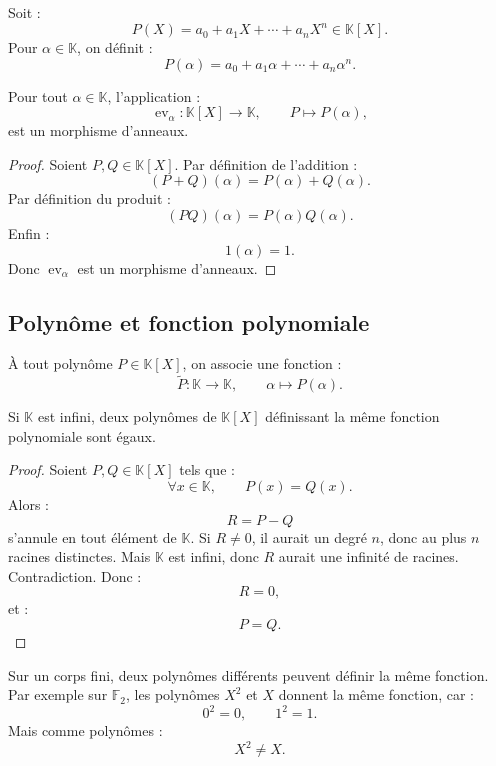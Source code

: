 \documentclass[11pt,a4paper]{article}
\newcommand{\K}{\mathbb K}
\begin{document}
\begin{definitionbox}
Soit :
\[
P(X)=a_0+a_1X+\cdots+a_nX^n\in\K[X].
\]
Pour \(\alpha\in\K\), on définit :
\[
P(\alpha)=a_0+a_1\alpha+\cdots+a_n\alpha^n.
\]
\end{definitionbox}

\begin{theorembox}
Pour tout \(\alpha\in\K\), l'application :
\[
\operatorname{ev}_\alpha:\K[X]\to\K,
\qquad
P\mapsto P(\alpha),
\]
est un morphisme d'anneaux.
\end{theorembox}

\begin{proof}
Soient \(P,Q\in\K[X]\).  
Par définition de l'addition :
\[
(P+Q)(\alpha)=P(\alpha)+Q(\alpha).
\]
Par définition du produit :
\[
(PQ)(\alpha)=P(\alpha)Q(\alpha).
\]
Enfin :
\[
1(\alpha)=1.
\]
Donc \(\operatorname{ev}_\alpha\) est un morphisme d'anneaux.
\end{proof}

\subsection{Polynôme et fonction polynomiale}

À tout polynôme \(P\in\K[X]\), on associe une fonction :
\[
\widetilde P:\K\to\K,
\qquad
\alpha\mapsto P(\alpha).
\]

\begin{theorembox}
Si \(\K\) est infini, deux polynômes de \(\K[X]\) définissant la même fonction polynomiale sont égaux.
\end{theorembox}

\begin{proof}
Soient \(P,Q\in\K[X]\) tels que :
\[
\forall x\in\K,\qquad P(x)=Q(x).
\]
Alors :
\[
R=P-Q
\]
s'annule en tout élément de \(\K\).  
Si \(R\neq0\), il aurait un degré \(n\), donc au plus \(n\) racines distinctes.  
Mais \(\K\) est infini, donc \(R\) aurait une infinité de racines.  
Contradiction.  
Donc :
\[
R=0,
\]
et :
\[
P=Q.
\]
\end{proof}

\begin{erreurbox}
Sur un corps fini, deux polynômes différents peuvent définir la même fonction.  
Par exemple sur \(\mathbb F_2\), les polynômes \(X^2\) et \(X\) donnent la même fonction, car :
\[
0^2=0,\qquad 1^2=1.
\]
Mais comme polynômes :
\[
X^2\neq X.
\]
\end{erreurbox}

\end{document}
